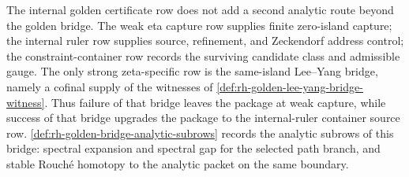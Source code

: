 \begin{principle}
\label{prin:rh-internal-golden-certificate-bridge-reduction}
The internal golden certificate row does not add a second analytic
route beyond the golden bridge.  The weak eta capture row supplies
finite zero-island capture; the internal ruler row supplies source,
refinement, and Zeckendorf address control; the constraint-container row
records the surviving candidate class and admissible gauge.  The only
strong zeta-specific row is the same-island Lee--Yang bridge, namely a
cofinal supply of the witnesses of
\autoref{def:rh-golden-lee-yang-bridge-witness}.  Thus failure of that
bridge leaves the package at weak capture, while success of that bridge
upgrades the package to the internal-ruler container source row.
\autoref{def:rh-golden-bridge-analytic-subrows} records the analytic
subrows of this bridge: spectral expansion and spectral gap for the
selected path branch, and stable Rouch\'e homotopy to the analytic packet
on the same boundary.
\end{principle}
